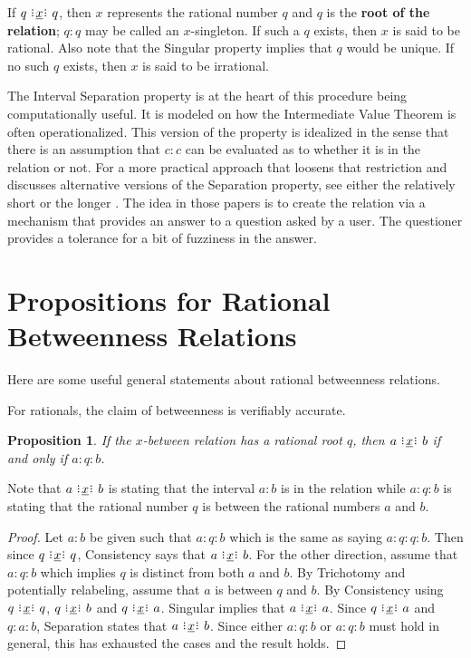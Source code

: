 \documentclass[12pt]{article}
\newtheorem{proposition}{Proposition}[section]
\begin{document}
If $q \xrel q$, then $x$ represents the rational number $q$ and $q$ is the \textbf{root of the relation}; $q:q$ may be called an $x$-singleton. If such a $q$ exists, then $x$ is said to be rational. Also note that the Singular property implies that $q$ would be unique. If no such $q$ exists, then $x$ is said to be irrational. 

The Interval Separation property is at the heart of this procedure being computationally useful. It is modeled on how the Intermediate Value Theorem is often operationalized. This version of the property is idealized in the sense that there is an assumption that $c:c$ can be evaluated as to whether it is in the relation or not. For a more practical approach that loosens that restriction and discusses alternative versions of the Separation property, see either the relatively short \cite{taylor24oraclerbr} or the longer \cite{taylor23main}. The idea in those papers is to create the relation via a mechanism that provides an answer to a question asked by a user. The questioner provides a tolerance for a bit of fuzziness in the answer. 


\section{Propositions for Rational Betweenness Relations}

Here are some useful general statements about rational betweenness relations. 

For rationals, the claim of betweenness is verifiably accurate. 

\begin{proposition}\label{br:rooted}
    If the $x$-between relation has a rational root $q$, then $a \xrel b$ if and only if $a : q : b$.
\end{proposition}

Note that $a \xrel b$ is stating that the interval $a:b$ is in the relation while $a:q:b$ is stating that the rational number $q$ is between the rational numbers $a$ and $b$.

\begin{proof}
    Let $a : b$ be given such that $a : q : b$ which is the same as saying $a:q:q:b$. Then since $q \xrel q$, Consistency says that $a \xrel b$. For the other direction, assume that \sout{$a:q:b$} which implies $q$ is distinct from both $a$ and $b$. By Trichotomy and potentially relabeling, assume that $a$ is between $q$ and $b$. By Consistency using $q \xrel q$, $q \xrel b$ and $q\xrel a$.  Singular implies that \sout{$a \xrel a$}. Since $q \xrel a$ and $q:a:b$, Separation states that \sout{$ a \xrel b$}. Since either $a:q:b$ or \sout{$a:q:b$} must hold in general, this has exhausted the cases and the result holds.  
\end{proof}
\end{document}
